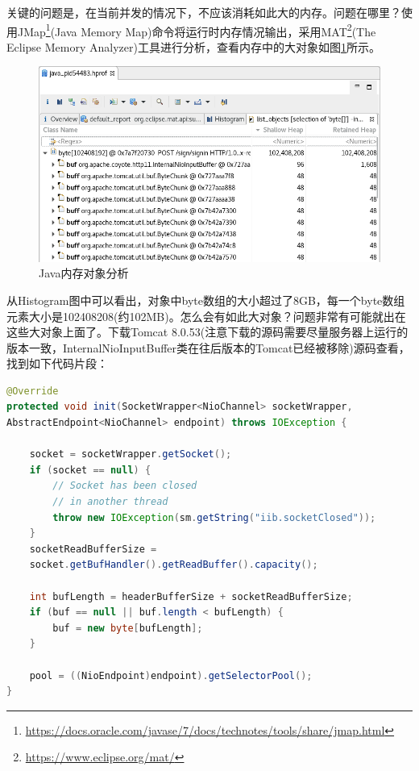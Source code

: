 \documentclass[8pt]{book}
\numberwithin{dummy}{section}
\theoremstyle{ocrenumbox}
\theoremstyle{blacknumex}
\theoremstyle{blacknumbox}
\theoremstyle{ocrenum}
\begin{document}
关键的问题是，在当前并发的情况下，不应该消耗如此大的内存。问题在哪里？使用JMap\footnote{\url{https://docs.oracle.com/javase/7/docs/technotes/tools/share/jmap.html}}(Java Memory Map)命令将运行时内存情况输出，采用MAT\footnote{\url{https://www.eclipse.org/mat/}}(The Eclipse Memory Analyzer)工具进行分析，查看内存中的大对象如图\ref{fig:javahprofanalysis}所示。

\begin{figure}[htbp]
	\centering
	\includegraphics[scale=0.3]{javahprofanalysis.png}
	\caption{Java内存对象分析}
	\label{fig:javahprofanalysis}
\end{figure}

从Histogram图中可以看出，对象中byte数组的大小超过了8GB，每一个byte数组元素大小是102408208(约102MB)。怎么会有如此大对象？问题非常有可能就出在这些大对象上面了。下载Tomcat 8.0.53(注意下载的源码需要尽量服务器上运行的版本一致，InternalNioInputBuffer类在往后版本的Tomcat已经被移除)源码查看，找到如下代码片段：

\begin{lstlisting}[language=Java]
@Override
protected void init(SocketWrapper<NioChannel> socketWrapper,
AbstractEndpoint<NioChannel> endpoint) throws IOException {

	socket = socketWrapper.getSocket();
	if (socket == null) {
		// Socket has been closed 
		// in another thread
		throw new IOException(sm.getString("iib.socketClosed"));
	}
	socketReadBufferSize =
	socket.getBufHandler().getReadBuffer().capacity();
	
	int bufLength = headerBufferSize + socketReadBufferSize;
	if (buf == null || buf.length < bufLength) {
		buf = new byte[bufLength];
	}
	
	pool = ((NioEndpoint)endpoint).getSelectorPool();
}
\end{lstlisting}
\end{document}
